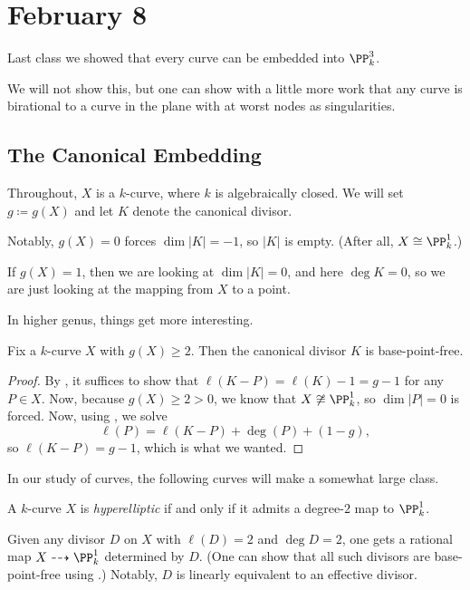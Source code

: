 \documentclass[../notes.tex]{subfiles}
\begin{document}
\section{February 8}

Last class we showed that every curve can be embedded into $\PP^3_k$.
\begin{remark}
	We will not show this, but one can show with a little more work that any curve is birational to a curve in the plane with at worst nodes as singularities.
\end{remark}

\subsection{The Canonical Embedding}
Throughout, $X$ is a $k$-curve, where $k$ is algebraically closed. We will set $g\coloneqq g(X)$ and let $K$ denote the canonical divisor.
\begin{example}
	Notably, $g(X)=0$ forces $\dim|K|=-1$, so $|K|$ is empty. (After all, $X\cong\PP^1_k$.)
\end{example}
\begin{example}
	If $g(X)=1$, then we are looking at $\dim|K|=0$, and here $\deg K=0$, so we are just looking at the mapping from $X$ to a point.
\end{example}
In higher genus, things get more interesting.
\begin{lemma} \label{lem:k-is-base-point-free}
	Fix a $k$-curve $X$ with $g(X)\ge2$. Then the canonical divisor $K$ is base-point-free.
\end{lemma}
\begin{proof}
	By , it suffices to show that $\ell(K-P)=\ell(K)-1=g-1$ for any $P\in X$. Now, because $g(X)\ge2>0$, we know that $X\not\cong\PP^1_k$, so $\dim|P|=0$ is forced. Now, using , we solve
	\[\ell(P)=\ell(K-P)+\deg(P)+(1-g),\]
	so $\ell(K-P)=g-1$, which is what we wanted.
\end{proof}
In our study of curves, the following curves will make a somewhat large class.
\begin{definition}[hyperelliptic]
	A $k$-curve $X$ is \textit{hyperelliptic} if and only if it admits a degree-$2$ map to $\PP^1_k$.
\end{definition}
\begin{remark}
	Given any divisor $D$ on $X$ with $\ell(D)=2$ and $\deg D=2$, one gets a rational map $X\dashrightarrow\PP^1_k$ determined by $D$. (One can show that all such divisors are base-point-free using .) Notably, $D$ is linearly equivalent to an effective divisor.
\end{remark}
\end{document}
